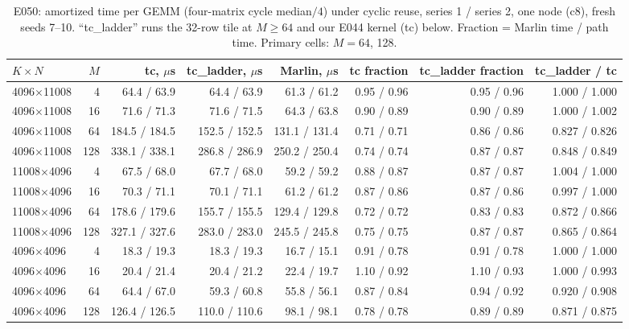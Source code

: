 \documentclass[sigconf,nonacm]{acmart}
\begin{document}
\begin{table}[t]
\caption{E050: amortized time per GEMM (four-matrix cycle median$/4$) under cyclic reuse, series 1 / series 2, one node (c8), fresh seeds 7--10. ``tc\_ladder'' runs the 32-row tile at $M \ge 64$ and our E044 kernel (tc) below. Fraction = Marlin time / path time. Primary cells: $M=64$, 128.}
\label{tab:e050}
\small
\begin{tabular}{lrrrrrrr}
\toprule
$K\times N$ & $M$ & tc, $\mu$s & tc\_ladder, $\mu$s & Marlin, $\mu$s & tc fraction & tc\_ladder fraction & tc\_ladder / tc \\
\midrule
4096$\times$11008 & 4 & 64.4 / 63.9 & 64.4 / 63.9 & 61.3 / 61.2 & 0.95 / 0.96 & 0.95 / 0.96 & 1.000 / 1.000 \\
4096$\times$11008 & 16 & 71.6 / 71.3 & 71.6 / 71.5 & 64.3 / 63.8 & 0.90 / 0.89 & 0.90 / 0.89 & 1.000 / 1.002 \\
4096$\times$11008 & 64 & 184.5 / 184.5 & 152.5 / 152.5 & 131.1 / 131.4 & 0.71 / 0.71 & 0.86 / 0.86 & 0.827 / 0.826 \\
4096$\times$11008 & 128 & 338.1 / 338.1 & 286.8 / 286.9 & 250.2 / 250.4 & 0.74 / 0.74 & 0.87 / 0.87 & 0.848 / 0.849 \\
11008$\times$4096 & 4 & 67.5 / 68.0 & 67.7 / 68.0 & 59.2 / 59.2 & 0.88 / 0.87 & 0.87 / 0.87 & 1.004 / 1.000 \\
11008$\times$4096 & 16 & 70.3 / 71.1 & 70.1 / 71.1 & 61.2 / 61.2 & 0.87 / 0.86 & 0.87 / 0.86 & 0.997 / 1.000 \\
11008$\times$4096 & 64 & 178.6 / 179.6 & 155.7 / 155.5 & 129.4 / 129.8 & 0.72 / 0.72 & 0.83 / 0.83 & 0.872 / 0.866 \\
11008$\times$4096 & 128 & 327.1 / 327.6 & 283.0 / 283.0 & 245.5 / 245.8 & 0.75 / 0.75 & 0.87 / 0.87 & 0.865 / 0.864 \\
4096$\times$4096 & 4 & 18.3 / 19.3 & 18.3 / 19.3 & 16.7 / 15.1 & 0.91 / 0.78 & 0.91 / 0.78 & 1.000 / 1.000 \\
4096$\times$4096 & 16 & 20.4 / 21.4 & 20.4 / 21.2 & 22.4 / 19.7 & 1.10 / 0.92 & 1.10 / 0.93 & 1.000 / 0.993 \\
4096$\times$4096 & 64 & 64.4 / 67.0 & 59.3 / 60.8 & 55.8 / 56.1 & 0.87 / 0.84 & 0.94 / 0.92 & 0.920 / 0.908 \\
4096$\times$4096 & 128 & 126.4 / 126.5 & 110.0 / 110.6 & 98.1 / 98.1 & 0.78 / 0.78 & 0.89 / 0.89 & 0.871 / 0.875 \\
\bottomrule
\end{tabular}
\end{table}
\end{document}
